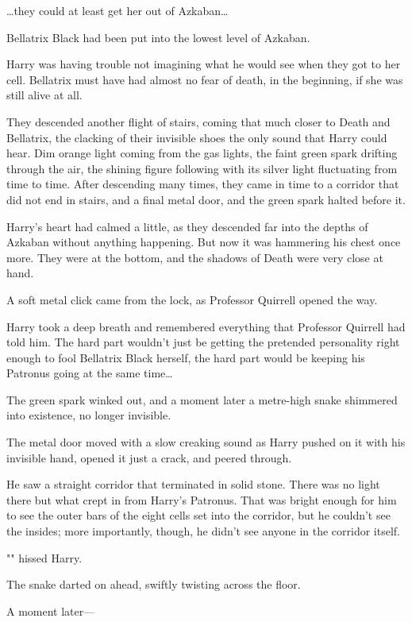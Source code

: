 {\ldots}they could at least get her out of Azkaban{\ldots}

Bellatrix Black had been put into the lowest level of Azkaban.

Harry was having trouble not imagining what he would see when they got to her
cell. Bellatrix must have had almost no fear of death, in the beginning, if she
was still alive at all.

They descended another flight of stairs, coming that much closer to Death and
Bellatrix, the clacking of their invisible shoes the only sound that Harry
could hear. Dim orange light coming from the gas lights, the faint green spark
drifting through the air, the shining figure following with its silver light
fluctuating from time to time.
\later
After descending many times, they came in time to a corridor that did not end
in stairs, and a final metal door, and the green spark halted before it.

Harry's heart had calmed a little, as they descended far into the depths of
Azkaban without anything happening. But now it was hammering his chest once
more. They were at the bottom, and the shadows of Death were very close at hand.

A soft metal click came from the lock, as Professor Quirrell opened the way.

Harry took a deep breath and remembered everything that Professor Quirrell had
told him. The hard part wouldn't just be getting the pretended personality
right enough to fool Bellatrix Black herself, the hard part would be keeping
his Patronus going at the same time{\ldots}

The green spark winked out, and a moment later a metre-high snake shimmered
into existence, no longer invisible.

The metal door moved with a slow creaking sound as Harry pushed on it with his
invisible hand, opened it just a crack, and peered through.

He saw a straight corridor that terminated in solid stone. There was no light
there but what crept in from Harry's Patronus. That was bright enough for him
to see the outer bars of the eight cells set into the corridor, but he couldn't
see the insides; more importantly, though, he didn't see anyone in the corridor
itself.

"" hissed Harry.

The snake darted on ahead, swiftly twisting across the floor.

A moment later---

